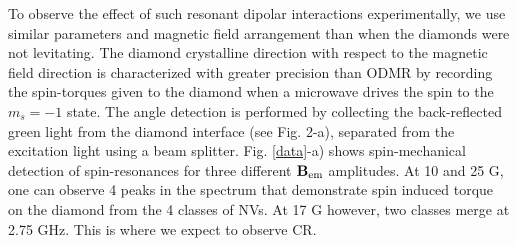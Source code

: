 \documentclass[preprintnumbers,amsmath,amssymb,superscriptaddress,twocolumn,showpacs]{revtex4-1}
\begin{document}

To observe the effect of such resonant dipolar interactions experimentally, we use similar parameters and magnetic field arrangement than when the diamonds were not levitating. The diamond crystalline direction with respect to the magnetic field direction is characterized with greater precision than ODMR by recording the spin-torques given to the diamond when a microwave drives the spin to the $m_s=-1$ state. 
The angle detection is performed by collecting the back-reflected green light from the diamond interface (see Fig. 2-a), separated from the excitation light using a beam splitter. 
Fig. \ref{data}-a) shows spin-mechanical detection of spin-resonances for three different $\bf B_{\rm em}$ amplitudes. 
At 10 and 25 G, one can observe 4 peaks in the spectrum that demonstrate spin induced torque on the diamond from the 4 classes of NVs.
At 17 G however, two classes merge at 2.75 GHz. This is where we expect to observe CR. 
\end{document}
